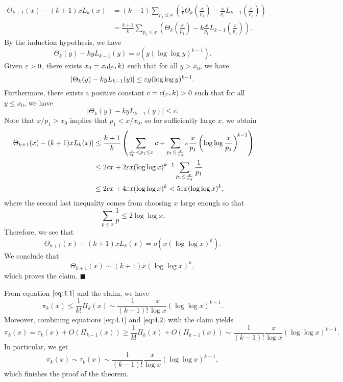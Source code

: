 \begin{pf}
\begin{align*}
        \Theta_{k+1}(x) - (k+1)xL_k(x) 
        &= (k+1) \sum_{p_1 \leq x} \left( \frac{1}{k} \Theta_k \left( \frac{x}{p_1} \right) 
        - \frac{x}{p_1} L_{k-1} \left( \frac{x}{p_1} \right) \right) \\ 
        &= \frac{k+1}{k} \sum_{p_1 \leq x} \left( \Theta_k \left( \frac{x}{p_1} \right) 
        - k \frac{x}{p_1} L_{k-1} \left( \frac{x}{p_1} \right) \right). 
    \end{align*}
    By the induction hypothesis, we have 
    \[ \Theta_k(y) - kyL_{k-1}(y) = o(y(\log \log y)^{k-1}). \] 
    Given $\varepsilon > 0$, there exists $x_0 = x_0(\varepsilon, k)$ such that for all 
    $y > x_0$, we have 
    \[ |\Theta_k(y) - kyL_{k-1}(y)| \leq \varepsilon y(\log \log y)^{k-1}. \] 
    Furthermore, there exists a positive constant $c = c(\varepsilon, k) > 0$ such 
    that for all $y \leq x_0$, we have 
    \[ |\Theta_k(y) - kyL_{k-1}(y)| \leq c. \] 
    Note that $x/p_1 > x_0$ implies that $p_1 < x/x_0$, so for sufficiently 
    large $x$, we obtain 
    \begin{align*} 
        |\Theta_{k+1}(x) - (k+1)xL_k(x)| 
        & \leq \frac{k+1}{k} \left( \sum_{\frac{x}{x_0} < p_1 \leq x} c 
        + \sum_{p_1 \leq \frac{x}{x_0}} \varepsilon \frac{x}{p_1} \left( 
        \log\log \frac{x}{p_1} \right)^{\!k-1} \right) \\
        & \leq 2cx + 2\varepsilon x(\log \log x)^{k-1} \sum_{p_1 \leq \frac{x}{x_0}} 
        \frac{1}{p_1} \\ 
        & \leq 2cx + 4\varepsilon x (\log \log x)^k < 5\varepsilon x(\log \log x)^k, 
    \end{align*}
    where the second last inequality comes from choosing $x$ large enough 
    so that 
    \[ \sum_{p\leq x} \frac{1}{p} \leq 2\log\log x. \] 
    Therefore, we see that 
    \[ \Theta_{k+1}(x) - (k+1)xL_k(x) = o\left( x(\log\log x)^k \right). \] 
    We conclude that 
    \[ \Theta_{k+1}(x) \sim (k+1) x(\log\log x)^k, \] 
    which proves the claim. \hfill$\blacksquare$

    From equation $\eqref{eq:4.1}$ and the claim, we have 
    \[ \pi_k(x) \leq \frac{1}{k!} \Pi_k(x) \sim 
    \frac{1}{(k-1)!} \frac{x}{\log x} (\log\log x)^{k-1}. \] 
    Moreover, combining equations $\eqref{eq:4.1}$ and 
    $\eqref{eq:4.2}$ with the claim yields 
    \[ \pi_k(x) = \tau_k(x) + O(\Pi_{k-1}(x)) 
    \geq \frac{1}{k!} \Pi_k(x) + O(\Pi_{k-1}(x)) 
    \sim \frac{1}{(k-1)!} \frac{x}{\log x} (\log \log x)^{k-1}. \] 
    In particular, we get 
    \[ \pi_k(x) \sim \tau_k(x) \sim \frac{1}{(k-1)!} \frac{x}{\log x} 
    (\log\log x)^{k-1}, \] 
    which finishes the proof of the theorem. 
\end{pf}

